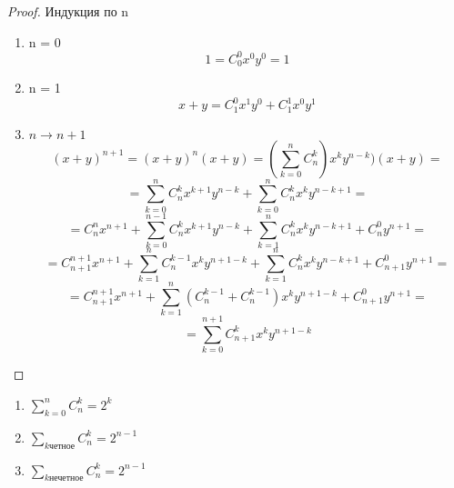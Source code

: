 \begin{proof}
Индукция по n
    \begin{enumerate}
        \item n = 0
         $$1 = C^0_0x^0y^0 = 1$$
        \item n = 1
         $$x + y = C_1^0x^1y^0 + C_1^1x^0y^1$$
        \item $n \to n + 1$
        $$(x + y)^{n + 1} = (x + y)^{n}(x + y) = (\sum_{k = 0}^{n}C_n^k)x^ky^{n - k})(x + y) = $$
        $$ = \sum_{k = 0}^{n}C_n^kx^{k + 1}y^{n - k} + \sum_{k = 0}^{n}C_n^kx^ky^{n - k + 1} = $$
        $$ = C_n^nx^{n + 1} + \sum_{k = 0}^{n - 1}C_n^kx^{k + 1}y^{n - k} + \sum_{k = 1}^{n}C_n^kx^ky^{n - k + 1} + C_n^0y^{n + 1} = $$
        $$ = C_{n + 1}^{n + 1}x^{n + 1} + \sum_{k = 1}^{n}C_n^{k - 1}x^{k}y^{n + 1 - k} + \sum_{k = 1}^{n}C_n^kx^ky^{n - k + 1} + C_{n + 1}^0y^{n + 1} = $$
        $$ = C_{n + 1}^{n + 1}x^{n + 1} + \sum_{k = 1}^{n}(C_n^{k - 1} + C_n^{k - 1})x^{k}y^{n + 1 - k} + C_{n + 1}^0y^{n + 1} = $$
        $$ = \sum_{k = 0}^{n + 1}C_{n + 1}^{k}x^{k}y^{n + 1 - k}$$
    \end{enumerate}
\end{proof}

\begin{conseq}
\begin{enumerate}
\item $\sum_{k = 0}^{n}C_n^k = 2^k$
\item $\sum_{k \text{четное}} C_n^k = 2^{n - 1}$
\item $\sum_{k \text{нечетное}} C_n^k = 2^{n - 1}$
\end{enumerate}
\end{conseq}